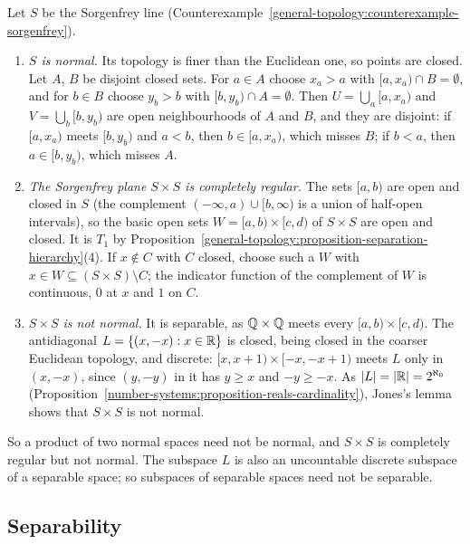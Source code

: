 \begin{example}\label{general-topology:example-sorgenfrey-plane}
Let $S$ be the Sorgenfrey line (Counterexample~\ref{general-topology:counterexample-sorgenfrey}).
\begin{enumerate}
\item \emph{$S$ is normal.} Its topology is finer than the Euclidean one, so points are closed. Let $A$, $B$ be disjoint closed sets. For $a \in A$ choose $x_a > a$ with $[a, x_a) \cap B = \emptyset$, and for
$b \in B$ choose $y_b > b$ with $[b, y_b) \cap A = \emptyset$. Then $U = \bigcup_a[a, x_a)$ and $V = \bigcup_b[b, y_b)$ are open neighbourhoods of $A$ and $B$, and they are disjoint: if $[a, x_a)$ meets
$[b, y_b)$ and $a < b$, then $b \in [a, x_a)$, which misses $B$; if $b < a$, then $a \in [b, y_b)$, which misses $A$.
\item \emph{The Sorgenfrey plane $S \times S$ is completely regular.} The sets $[a, b)$ are open and closed in $S$ (the complement $(-\infty, a) \cup [b, \infty)$ is a union of half-open intervals), so the
basic open sets $W = [a, b) \times [c, d)$ of $S \times S$ are open and closed. It is $T_1$ by Proposition~\ref{general-topology:proposition-separation-hierarchy}(4). If $x \notin C$ with $C$ closed, choose
such a $W$ with $x \in W \subseteq (S \times S) \setminus C$; the indicator function of the complement of $W$ is continuous, $0$ at $x$ and $1$ on $C$.
\item \emph{$S \times S$ is not normal.} It is separable, as $\mathbb{Q} \times \mathbb{Q}$ meets every $[a, b) \times [c, d)$. The antidiagonal $L = \{(x, -x) : x \in \mathbb{R}\}$ is closed, being closed in the coarser
Euclidean topology, and discrete: $[x, x + 1) \times [-x, -x + 1)$ meets $L$ only in $(x, -x)$, since $(y, -y)$ in it has $y \geq x$ and $-y \geq -x$. As $|L| = |\mathbb{R}| = 2^{\aleph_0}$
(Proposition~\ref{number-systems:proposition-reals-cardinality}), Jones's lemma shows that $S \times S$ is not normal.
\end{enumerate}
So a product of two normal spaces need not be normal, and $S \times S$ is completely regular but not normal. The subspace $L$ is also an uncountable discrete subspace of a separable space; so subspaces of
separable spaces need not be separable.
\end{example}

\subsection{Separability}\label{general-topology:subsection-separability}

